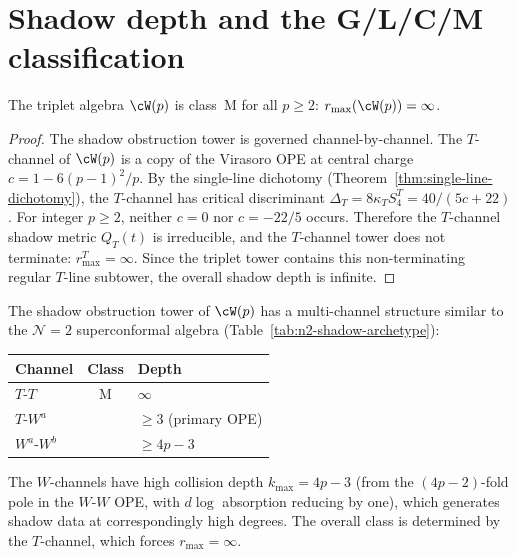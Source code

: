 
\section{Shadow depth and the G/L/C/M classification}
\label{sec:wp-shadow-depth}

\begin{proposition}\label{prop:wp-shadow-class}
The triplet algebra $\cW(p)$ is class~M for all $p \geq 2$:
$r_{\max}(\cW(p)) = \infty$.
\end{proposition}

\begin{proof}
The shadow obstruction tower is governed channel-by-channel.
The $T$-channel of $\cW(p)$ is a copy of the Virasoro OPE
at central charge $c = 1 - 6(p-1)^2/p$. By the single-line
dichotomy (Theorem~\ref{thm:single-line-dichotomy}), the
$T$-channel has critical discriminant
$\Delta_T = 8\kappa_T S_4^T = 40/(5c+22)$. For integer
$p\ge2$, neither $c=0$ nor $c=-22/5$ occurs. Therefore the
$T$-channel shadow metric $Q_T(t)$ is irreducible, and the
$T$-channel tower does not terminate: $r_{\max}^T = \infty$.
Since the triplet tower contains this non-terminating regular
$T$-line subtower, the overall shadow depth is infinite.
\end{proof}

\begin{remark}
\label{rem:wp-multichannel}
The shadow obstruction tower of $\cW(p)$ has a
multi-channel structure similar to the $\mathcal{N}=2$
superconformal algebra
(Table~\ref{tab:n2-shadow-archetype}):
\begin{center}
\renewcommand{\arraystretch}{1.3}
\begin{tabular}{lcl}
\toprule
Channel & Class & Depth \\
\midrule
$T$-$T$ & M & $\infty$ \\
$T$-$W^a$ & & $\geq 3$ (primary OPE) \\
$W^a$-$W^b$ & & $\geq 4p - 3$ \\
\bottomrule
\end{tabular}
\end{center}
The $W$-channels have high collision depth $k_{\max} = 4p - 3$
(from the $(4p{-}2)$-fold pole in the $W$-$W$ OPE, with
$d\log$ absorption reducing by one), which generates shadow
data at correspondingly high degrees. The overall class is
determined by the $T$-channel, which forces $r_{\max} = \infty$.
\end{remark}


